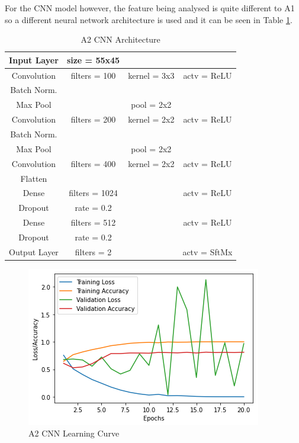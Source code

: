 \documentclass{article}
\begin{document}
    For the CNN model however, the feature being analysed is quite different to A1 so a different neural network architecture is used and it can be seen in Table \ref{table:A2_Arch}.
 	\begin{table}[]
	\begin{tabular}{|c|c c c|}
		\hline
		Input Layer & size = 55x45 	&				&	\\
		\hline
		Convolution & filters = 100 & kernel = 3x3 	& actv = ReLU\\
		\hline
		Batch Norm. & 				&				&\\
		\hline
		Max Pool	&				& pool = 2x2  	& \\
		\hline
		Convolution & filters = 200 & kernel = 2x2 	& actv = ReLU\\
		\hline
		Batch Norm. &				&				&\\
		\hline
		Max Pool	&				& pool = 2x2  	& \\
		\hline
		Convolution & filters = 400 & kernel = 2x2	& actv = ReLU\\
		\hline
		Flatten 	& 				& 				&\\
		\hline
		Dense 		&filters = 1024 &				& actv = ReLU\\
		\hline
		Dropout 	& rate = 0.2 	&	 			&\\
		\hline
		Dense 		& filters = 512 &				& actv = ReLU\\
		\hline
		Dropout 	& rate = 0.2 	& 				&\\
		\hline
		Output Layer& filters = 2 	&				&actv = SftMx\\
		\hline
	\end{tabular}
	\caption{A2 CNN Architecture}
	\label{table:A2_Arch}
	\end{table}
    \begin{figure}[htb]
    	\centering
    	\includegraphics[scale=0.7]{Figures/A2_CNN_Graph.PNG}
    	\caption{A2 CNN Learning Curve}
    	\label{fig:A2_curve}
    \end{figure} 
\end{document}

